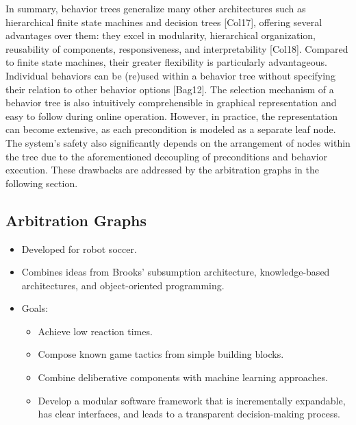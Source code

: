 In summary, behavior trees generalize many other architectures such as hierarchical finite state machines and decision trees [Col17], offering several advantages over them: they excel in modularity, hierarchical organization, reusability of components, responsiveness, and interpretability [Col18].
Compared to finite state machines, their greater flexibility is particularly advantageous.
Individual behaviors can be (re)used within a behavior tree without specifying their relation to other behavior options [Bag12].
The selection mechanism of a behavior tree is also intuitively comprehensible in graphical representation and easy to follow during online operation.
However, in practice, the representation can become extensive, as each precondition is modeled as a separate leaf node.
The system's safety also significantly depends on the arrangement of nodes within the tree due to the aforementioned decoupling of preconditions and behavior execution.
These drawbacks are addressed by the arbitration graphs in the following section.

\subsection*{Arbitration Graphs}

\begin{itemize}
    \item Developed for robot soccer.
    \item Combines ideas from Brooks' subsumption architecture, knowledge-based architectures, and object-oriented programming.
    \item Goals:
          \begin{itemize}
              \item Achieve low reaction times.
              \item Compose known game tactics from simple building blocks.
              \item Combine deliberative components with machine learning approaches.
              \item Develop a modular software framework that is incrementally expandable, has clear interfaces, and leads to a transparent decision-making process.
          \end{itemize}
\end{itemize}


